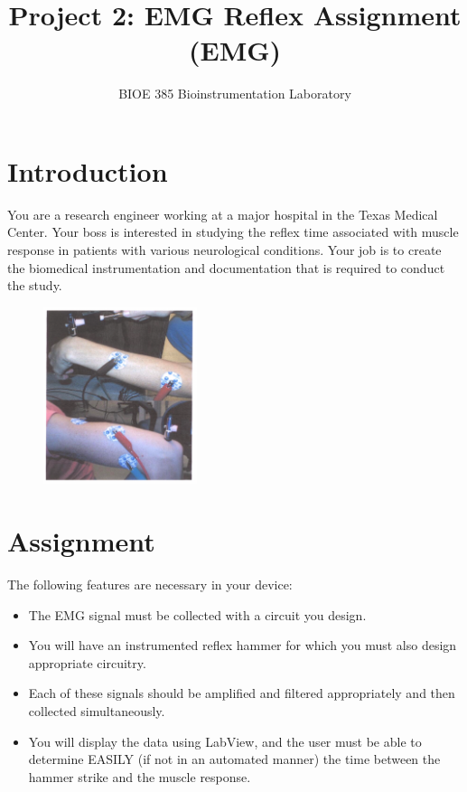 \documentclass{article}
\title{Project 2: EMG Reflex Assignment (EMG)}
\author{BIOE 385 Bioinstrumentation Laboratory}
\date{}
\begin{document}
\large
\maketitle
\section*{Introduction}
You are a research engineer working at a major hospital in the Texas Medical Center. Your boss is interested in studying the reflex time associated with muscle response in patients with various neurological conditions. Your job is to create the biomedical instrumentation and documentation that is required to conduct the study.\\

\begin{figure}[h]
    \includegraphics[width=0.4\textwidth]{emg_fig_1.png}
    \centering
\label{fig_1}
\end{figure}

\section*{Assignment}

The following features are necessary in your device:
\begin{itemize}
	\item The EMG signal must be collected with a circuit you design.
	\item You will have an instrumented reflex hammer for which you must also design appropriate circuitry.
	\item Each of these signals should be amplified and filtered appropriately and then collected simultaneously.
	\item You will display the data using LabView, and the user must be able to determine EASILY (if not in an automated manner) the time between the hammer strike and the muscle response.
\end{itemize}
\end{document}
